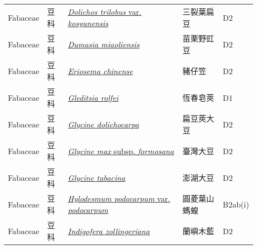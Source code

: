 {\begin{longtable}{L{2.5cm}L{2cm}L{5cm}L{2.5cm}L{3cm}}
    Fabaceae & 豆科 & \href{http://www.theplantlist.org/tpl1.1/search?q=Dolichos+trilobus+var.+kosyunensis}{\textit{Dolichos trilobus} var. \textit{kosyunensis} } & 三裂葉扁豆 & D2    \\
    Fabaceae & 豆科 & \href{http://www.theplantlist.org/tpl1.1/search?q=Dumasia+miaoliensis}{\textit{Dumasia miaoliensis} } & 苗栗野豇豆 & D2    \\
    Fabaceae & 豆科 & \href{http://www.theplantlist.org/tpl1.1/search?q=Eriosema+chinense}{\textit{Eriosema chinense} } & 豬仔笠 & D2    \\
    Fabaceae & 豆科 & \href{http://www.theplantlist.org/tpl1.1/search?q=Gleditsia+rolfei}{\textit{Gleditsia rolfei} } & 恆春皂莢 & D1    \\
    Fabaceae & 豆科 & \href{http://www.theplantlist.org/tpl1.1/search?q=Glycine+dolichocarpa}{\textit{Glycine dolichocarpa} } & 扁豆莢大豆 & D2    \\
    Fabaceae & 豆科 & \href{http://www.theplantlist.org/tpl1.1/search?q=Glycine+max+subsp.+formosana}{\textit{Glycine max} subsp. \textit{formosana} } & 臺灣大豆 & D2    \\
    Fabaceae & 豆科 & \href{http://www.theplantlist.org/tpl1.1/search?q=Glycine+tabacina}{\textit{Glycine tabacina} } & 澎湖大豆 & D2    \\
    Fabaceae & 豆科 & \href{http://www.theplantlist.org/tpl1.1/search?q=Hylodesmum+podocarpum+var.+podocarpum}{\textit{Hylodesmum podocarpum} var. \textit{podocarpum} } & 圓菱葉山螞蝗 & B2ab(i)    \\
    Fabaceae & 豆科 & \href{http://www.theplantlist.org/tpl1.1/search?q=Indigofera+zollingeriana}{\textit{Indigofera zollingeriana} } & 蘭嶼木藍 & D2    \\

\end{longtable}}
